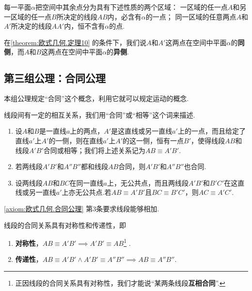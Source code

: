 \begin{corollary}\label{theorem:欧式几何.定理10}
每一平面\(\alpha\)把空间中其余点分为具有下述性质的两个区域：
一区域的任一点\(A\)和另一区域的任一点\(B\)所决定的线段\(AB\)内，必含有\(\alpha\)的一点；
同一区域的任意两点\(A\)和\(A'\)所决定的线段\(AA'\)内，恒不含有\(\alpha\)的点.
\end{corollary}

\begin{definition}
在\cref{theorem:欧式几何.定理10} 的条件下，我们说\(A\)和\(A'\)这两点在空间中平面\(\alpha\)的\textbf{同侧}，而\(A\)和\(B\)这两点在空间中平面\(\alpha\)的\textbf{异侧}.
\end{definition}

\subsection{第三组公理：合同公理}
本组公理规定“合同”这个概念，利用它就可以规定运动的概念.

\begin{axiom}[合同公理]\label{axiom:欧式几何.合同公理}
线段间有一定的相互关系，我们用“合同”或“相等”这个词来描述.
\begin{enumerate}
\item 设\(A\)和\(B\)是一直线\(a\)上的两点，\(A'\)是这直线或另一直线\(a'\)上的一点，而且给定了直线\(a'\)上\(A'\)的一侧，则在直线\(a'\)上\(A'\)的这一侧，恒有一点\(B'\)，使得线段\(AB\)和线段\(A'B'\)合同或相等；我们将上述关系记为\(AB \equiv A'B'\).

\item 若两线段\(A'B'\)和\(A''B''\)都和线段\(AB\)合同，则\(A'B'\)和\(A''B''\)也合同.

\item 设两线段\(AB\)和\(BC\)在同一直线\(a\)上，无公共点，而且两线段\(A'B'\)和\(B'C'\)在这直线或另一直线\(a'\)上亦无公共点.若\(AB \equiv A'B'\)且\(BC \equiv B'C'\)，则\(AC \equiv A'C'\).
\end{enumerate}
\end{axiom}
\cref{axiom:欧式几何.合同公理} 第3条要求线段能够相加.

\begin{property}
线段的合同关系具有对称性和传递性，即\begin{enumerate}
\item \textbf{对称性}，\(AB \equiv A'B' \implies A'B' \equiv AB\)\footnote{%
正因线段的合同关系具有对称性，我们才能说“某两条线段\textbf{互相合同}”.%
}
.
\item \textbf{传递性}，\(AB \equiv A'B' \land A'B' \equiv A''B'' \implies AB \equiv A''B''\).
\end{enumerate}
\end{property}

